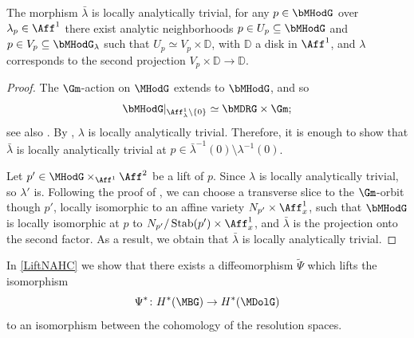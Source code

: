 \begin{prop}\label{blambdaloctriv}
The morphism $\bar{\lambda}$ is locally analytically trivial, \ie for any $p \in \bMHodG$ over $\lambda_p \in \Aff^1$ there exist analytic neighborhoods $p \in U_p \subseteq \bMHodG$ and $p \in V_p \subseteq \bMHodG_{\lambda}$ such that $U_p\simeq V_p \times \mathbb{D}$, with $\mathbb{D}$ a disk in $\Aff^1$, and $\lambda$ corresponds to the second projection $V_p \times \mathbb{D} \to \mathbb{D}$.
\end{prop}
\begin{proof}
The $\Gm$\nobreakdash-action on $\MHodG$ extends to $\bMHodG$, and so
\[
\bMHodG|_{\Aff^1_\lambda \setminus \{0\}} \simeq \bMDRG \times \Gm;
\]
see also \cite[p.\,232]{Simpson1997}. By \cite[Th.\,9.1]{Simpson1997}, $\lambda$ is locally analytically trivial. Therefore, it is enough to show that $\bar{\lambda}$ is locally analytically trivial at $p \in \bar{\lambda}^{-1}(0) \setminus {\lambda}^{-1}(0)$.

Let $p' \in \MHodG \times_{\Aff^1}\Aff^2$ be a lift of $p$. Since $\lambda$ is locally analytically trivial, so $\lambda'$ is. Following the proof of \cite[Lem.\,3.5.1]{deCataldo2020}, we can choose a transverse slice to the $\Gm$\nobreakdash-orbit though $p'$, locally isomorphic to an affine variety $N_{p'} \times \Aff^1_x$, such that $\bMHodG$ is locally isomorphic at $p$ to $N_{p'}/\operatorname{Stab}(p') \times \Aff^1_x$, and $\bar{\lambda}$ is the projection onto the second factor. As a result, we obtain that $\bar{\lambda}$ is locally analytically trivial.
\end{proof}

In \cref{LiftNAHC} we show that there exists a diffeomorphism $\widetilde{\Psi}$ which lifts the isomorphism
\[
\Psi^*\colon H^*(\MBG) \to H^*(\MDolG)
\]
to an isomorphism between the cohomology of the resolution spaces.

